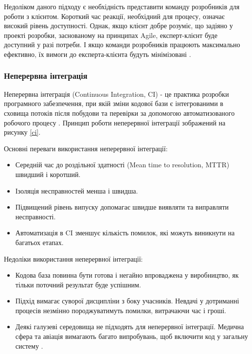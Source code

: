 Недоліком даного підходу є необхідність представити команду розробників для роботи з клієнтом.
Короткий час реакції, необхідний для процесу, означає високий рівень доступності.
Однак, якщо клієнт добре розуміє, що задіяно у проекті розробки,
заснованому на принципах Agile, експерт-клієнт буде доступний у разі потреби.
І якщо команди розробників працюють максимально ефективно,
їх вимоги до експерта-клієнта будуть мінімізовані \cite{bdd-article-2}.

\clearpage

\subsubsection{Неперервна інтеграція}
Неперервна інтеграція (Continuous Integration, CI)
- це практика розробки програмного забезпечення,
при якій зміни кодової бази є інтегрованими в сховища потоків після
побудови та перевірки за допомогою автоматизованого робочого процесу \cite{ci-book}.
Принцип роботи неперервної інтеграції зображений на рисунку \ref{ci}.

Основні переваги використання неперервної інтеграції:

\begin{itemize}
		\item Середній час до роздільної здатності 
			(Mean time to resolution, MTTR) швидший і коротший.
		\item Ізоляція несправностей менша і швидша.
		\item Підвищений рівень випуску допомагає швидше виявляти
			та виправляти несправності.
		\item Автоматизація в CI зменшує кількість помилок,
			які можуть виникнути на багатьох етапах.
\end{itemize}

Недоліки використання неперервної інтеграції:

\begin{itemize}
		\item Кодова база повинна бути готова і негайно впроваджена у виробництво,
			як тільки поточний результат буде успішним.
		\item Підхід вимагає суворої дисципліни з боку учасників.
			Невдачі у дотриманні процесів незмінно породжуватимуть помилки,
			витрачаючи час і гроші.
		\item Деякі галузеві середовища не підходять для неперервної інтеграції.
			Медична сфера та авіація вимагають багато випробувань,
			щоб включити код у загальну систему \cite{ci-article}.
\end{itemize}



